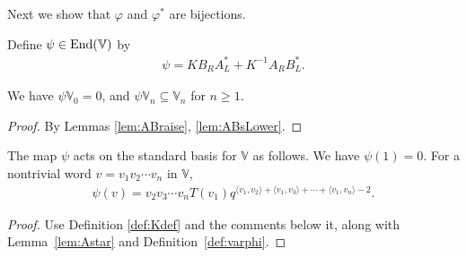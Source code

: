 Next we show that $\varphi$ and $\varphi^*$ are bijections.

\begin{Definition}\label{def:varphi} Define $\psi \in {\rm End}(\mathbb V)$ by
\begin{gather}\label{eq:varphi}
\psi = K B_R A^*_L + K^{-1} A_R B^*_L.
\end{gather}
\end{Definition}

\begin{Lemma}We have $\psi \mathbb V_0=0$, and $\psi \mathbb V_n \subseteq \mathbb V_n$ for $n \geq 1$.
\end{Lemma}
\begin{proof} By Lemmas \ref{lem:ABraise}, \ref{lem:ABsLower}.
\end{proof}

\begin{Lemma}\label{lem:varphiAct} The map $\psi $ acts on the standard basis for $\mathbb V$ as follows. We have $\psi(1)=0$. For a nontrivial word $v=v_1 v_2 \cdots v_n$ in $\mathbb V$,
\begin{gather*}
\psi(v) = v_2 v_3 \cdots v_n T(v_1)q^{\langle v_1, v_2\rangle+\langle v_1, v_3\rangle+\cdots + \langle v_1, v_n\rangle-2}.
\end{gather*}
\end{Lemma}
\begin{proof} Use Definition \ref{def:Kdef} and the comments below it, along with Lemma~\ref{lem:Astar} and Definition~\ref{def:varphi}.
\end{proof}

